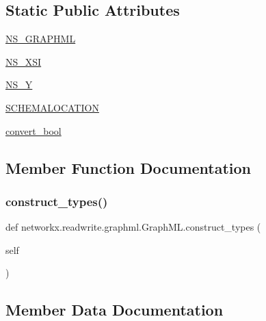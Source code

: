 \subsection*{Static Public Attributes}
\begin{DoxyCompactItemize}
\item 
\hyperlink{classnetworkx_1_1readwrite_1_1graphml_1_1GraphML_a2e8fa077efc039ee8c32f4e143d4676b}{N\+S\+\_\+\+G\+R\+A\+P\+H\+ML}
\item 
\hyperlink{classnetworkx_1_1readwrite_1_1graphml_1_1GraphML_a4d40425ddeda1a2d505b1f09ef986342}{N\+S\+\_\+\+X\+SI}
\item 
\hyperlink{classnetworkx_1_1readwrite_1_1graphml_1_1GraphML_a1c9b14ae403ff0dba5120e27e3d4952c}{N\+S\+\_\+Y}
\item 
\hyperlink{classnetworkx_1_1readwrite_1_1graphml_1_1GraphML_a7c89fa7eb8c9818a107b026824f9ef2b}{S\+C\+H\+E\+M\+A\+L\+O\+C\+A\+T\+I\+ON}
\item 
\hyperlink{classnetworkx_1_1readwrite_1_1graphml_1_1GraphML_a0e748c6d52b30e9257867c4e35f86305}{convert\+\_\+bool}
\end{DoxyCompactItemize}


\subsection{Member Function Documentation}
\mbox{\label{classnetworkx_1_1readwrite_1_1graphml_1_1GraphML_a25fb416e6fe21d1b5dfdbfbda4d7cb5a}} 
\subsubsection{\texorpdfstring{construct\+\_\+types()}{construct\_types()}}
{\footnotesize\ttfamily def networkx.\+readwrite.\+graphml.\+Graph\+M\+L.\+construct\+\_\+types (\begin{DoxyParamCaption}\item[{}]{self }\end{DoxyParamCaption})}



\subsection{Member Data Documentation}
\mbox{\label{classnetworkx_1_1readwrite_1_1graphml_1_1GraphML_a0e748c6d52b30e9257867c4e35f86305}} 
